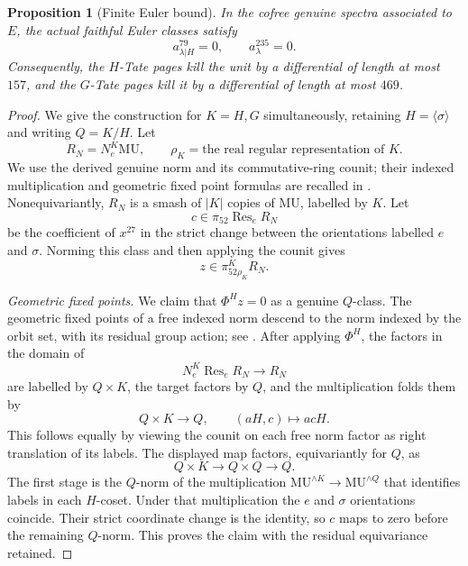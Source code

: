 \documentclass[11pt]{article}
\newtheorem{proposition}[theorem]{Proposition}
\theoremstyle{definition}
\theoremstyle{remark}
\numberwithin{equation}{section}
\begin{document}
\begin{proposition}[Finite Euler bound]\label{det:euler-bound}
In the cofree genuine spectra associated to \(E\), the actual
faithful Euler classes satisfy
\[
 a_{\lambda|H}^{79}=0,\qquad a_\lambda^{235}=0.
\]
Consequently, the \(H\)-Tate pages kill the unit by a
differential of length at most \(157\), and the \(G\)-Tate
pages kill it by a differential of length at most \(469\).
\end{proposition}

\begin{proof}
We give the construction for \(K=H,G\) simultaneously, retaining
\(H=\langle\sigma\rangle\) and writing \(Q=K/H\).
Let
\[
 R_N=N_e^K\mathrm{MU},\qquad \rho_K=\text{the real regular representation of }K .
\]
We use the derived genuine norm and its commutative-ring
counit; their indexed multiplication and geometric fixed
point formulas are recalled in \cite[Section~2 and
Appendix~B]{HHR2016}.
Nonequivariantly, \(R_N\) is a smash of \(|K|\) copies of
\(\mathrm{MU}\), labelled by \(K\).
Let
\[
 c\in\pi_{52}\operatorname{Res}_eR_N
\]
be the coefficient of \(x^{27}\) in the strict change between
the orientations labelled \(e\) and \(\sigma\).
Norming this class and then applying the counit gives
\begin{equation}\label{det:norm-class}
 z\in\pi_{52\rho_K}^K R_N.
\end{equation}

\emph{Geometric fixed points.}
We claim that \(\Phi^H z=0\) as a genuine \(Q\)-class.
The geometric fixed points of a free indexed norm descend
to the norm indexed by the orbit set, with its residual group action;
see \cite[Corollary~2.11]{MSZNorms}.
After applying \(\Phi^H\), the factors in the domain of
\[
 N_e^K\operatorname{Res}_eR_N\longrightarrow R_N
\]
are labelled by \(Q\times K\), the target factors by \(Q\),
and the multiplication folds them by
\[
 Q\times K\longrightarrow Q,\qquad (aH,c)\longmapsto acH .
\]
This follows equally by viewing the counit on each free
norm factor as right translation of its labels.
The displayed map factors, equivariantly for \(Q\), as
\[
 Q\times K\longrightarrow Q\times Q\longrightarrow Q.
\]
The first stage is the \(Q\)-norm of the multiplication
\(\mathrm{MU}^{\wedge K}\to\mathrm{MU}^{\wedge Q}\) that identifies labels
in each \(H\)-coset.  Under that multiplication the \(e\)
and \(\sigma\) orientations coincide.
Their strict coordinate change is the identity, so \(c\)
maps to zero before the remaining \(Q\)-norm.
This proves the claim with the residual equivariance retained.


\end{proof}
\end{document}
